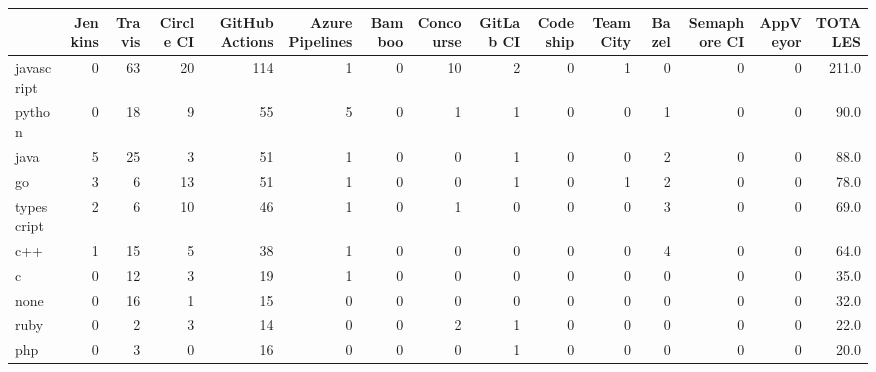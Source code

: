 \begin{tabular}{lrrrrrrrrrrrrrr}
\toprule
{} &  Jenkins &  Travis &  Circle CI &  GitHub Actions &  Azure Pipelines &  Bamboo &  Concourse &  GitLab CI &  Codeship &  TeamCity &  Bazel &  Semaphore CI &  AppVeyor &  TOTALES \\
\midrule
javascript    &        0 &      63 &         20 &             114 &                1 &       0 &         10 &          2 &         0 &         1 &      0 &             0 &         0 &    211.0 \\
python        &        0 &      18 &          9 &              55 &                5 &       0 &          1 &          1 &         0 &         0 &      1 &             0 &         0 &     90.0 \\
java          &        5 &      25 &          3 &              51 &                1 &       0 &          0 &          1 &         0 &         0 &      2 &             0 &         0 &     88.0 \\
go            &        3 &       6 &         13 &              51 &                1 &       0 &          0 &          1 &         0 &         1 &      2 &             0 &         0 &     78.0 \\
typescript    &        2 &       6 &         10 &              46 &                1 &       0 &          1 &          0 &         0 &         0 &      3 &             0 &         0 &     69.0 \\
c++           &        1 &      15 &          5 &              38 &                1 &       0 &          0 &          0 &         0 &         0 &      4 &             0 &         0 &     64.0 \\
c             &        0 &      12 &          3 &              19 &                1 &       0 &          0 &          0 &         0 &         0 &      0 &             0 &         0 &     35.0 \\
none          &        0 &      16 &          1 &              15 &                0 &       0 &          0 &          0 &         0 &         0 &      0 &             0 &         0 &     32.0 \\
ruby          &        0 &       2 &          3 &              14 &                0 &       0 &          2 &          1 &         0 &         0 &      0 &             0 &         0 &     22.0 \\
php           &        0 &       3 &          0 &              16 &                0 &       0 &          0 &          1 &         0 &         0 &      0 &             0 &         0 &     20.0 \\

\end{tabular}
